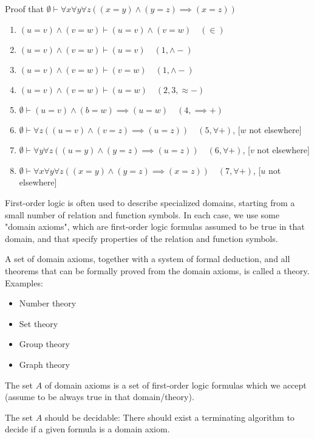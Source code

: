 \documentclass{article}
\begin{document}
Proof that $\emptyset \vdash \forall x \forall y \forall z((x = y) \wedge (y = z) \implies (x = z))$
\begin{enumerate}
    \item $(u = v) \wedge (v = w) \vdash (u = v) \wedge (v = w) \quad (\in)$ 
    \item $(u = v) \wedge (v = w) \vdash (u = v) \quad (1, \wedge -)$
    \item $(u = v) \wedge (v = w) \vdash (v = w) \quad (1, \wedge -)$
    \item $(u = v) \wedge (v = w) \vdash (u = w) \quad (2,3, \approx -)$
    \item $\emptyset \vdash (u = v) \wedge (b = w) \implies (u = w) \quad (4, \implies +)$
    \item $\emptyset \vdash \forall z((u = v) \wedge (v = z) \implies (u = z)) \quad (5, \forall +)$, [$w$ not elsewhere]
    \item $\emptyset \vdash \forall y \forall z ((u = y) \wedge (y = z) \implies (u = z)) \quad (6, \forall +)$, [$v$ not elsewhere]
    \item $\emptyset \vdash \forall x \forall y \forall z ((x =y) \wedge (y = z) \implies (x = z)) \quad (7, \forall+)$, [$u$ not elsewhere]
\end{enumerate}

First-order logic is often used to describe specialized domains, starting from a small number of relation and function symbols. In each case, we use some "domain axioms", which are first-order logic formulas assumed to be true in that domain, and that specify properties of the relation and function symbols.

A set of domain axioms, together with a system of formal deduction, and all theorems that can be formally proved from the domain axioms, is called a theory. Examples:
\begin{itemize}
    \item Number theory
    \item Set theory
    \item Group theory
    \item Graph theory
\end{itemize}

The set $A$ of domain axioms is a set of first-order logic formulas which we accept (assume to be always true in that domain/theory).

The set $A$ should be decidable: There should exist a terminating algorithm to decide if a given formula is a domain axiom.
\end{document}
